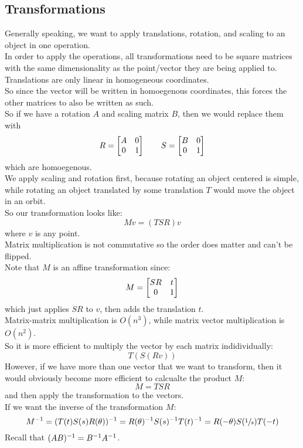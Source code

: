 \documentclass[12pt]{article}
\begin{document}
\newpage

\subsection*{Transformations}

Generally speaking, we want to apply
translations, rotation, and scaling to an object
in one operation. \\

In order to apply the operations, all transformations
need to be square matrices with the same dimensionality
as the point/vector they are being applied to. \\
Translations are only linear in homogeneous coordinates. \\
So since the vector will be written in homoegenous
coordinates,
this forces the other matrices to also be written as such. \\
So if we have a rotation $A$ and scaling matrix $B$,
then we would replace them with
\[ R = \begin{bmatrix} {A} & {0} \\{0} & {1} \end{bmatrix}
\qquad S = \begin{bmatrix} {B} & {0} \\ {0} & {1} \end{bmatrix} \]
which are homoegenous. \\

We apply scaling and rotation first,
because rotating an object centered is simple,
while rotating an object translated by some 
translation $T$ would move the object in an orbit. \\
So our transformation looks like:
\[ Mv = (TSR)v \]
where $v$ is any point. \\
Matrix multiplication is not commutative so
the order does matter and can't be flipped. \\
Note that $M$ is an affine transformation since:
\[ M = \begin{bmatrix} {SR} & {t} \\ {0} & {1} \end{bmatrix} \]
which just applies $SR$ to $v$,
then adds the translation $t$. \\

Matrix-matrix multiplication is $O(n^3)$,
while matrix vector multiplication is $O(n^2)$. \\
So it is more efficient to multiply the vector
by each matrix indidividually:
\[ T(S(Rv)) \]
However, if we have more than one vector
that we want to transform,
then it would obviously become more efficient
to calcualte the product $M$:
\[ M = TSR \]
and then apply the transformation to the vectors. \\

If we want the inverse of the transformation $M$:
\[ M^{-1} = (T(t)S(s)R(\theta))^{-1}
= R(\theta)^{-1} S(s)^{-1} T(t)^{-1} 
= R(-\theta)S(\sfrac{1}{s})T(-t) \]
Recall that $(AB)^{-1} = B^{-1} A^{-1}$. \\
\end{document}
